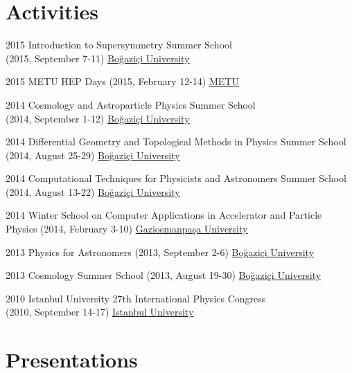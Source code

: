 \documentclass[]{friggeri-cv}
\begin{document}
\section{Activities}

\begin{entrylist}
		 	
	\entry
	{2015}
	{Introduction to Supersymmetry  Summer School \\ \normalfont (2015, September 7-11)}
	{\href{http://fezagursey.boun.edu.tr/?sayfa=29}{Boğaziçi University}}
	
	\entry
	{2015}
	{METU HEP Days  \normalfont (2015, February 12-14)}
	{\href{http://yef.ankara.edu.tr/yefgunleri2015/index.html}{METU}}
		
	\entry
	{2014}
	{Cosmology and Astroparticle Physics Summer School \\ \normalfont (2014, September 1-12)}
	{\href{http://fezagursey.boun.edu.tr/?sayfa=33}{Boğaziçi University}}
		
	\entry
	{2014}
	{Differential Geometry and Topological Methods in Physics Summer School  \normalfont (2014, August 25-29)}
	{\href{http://fezagursey.boun.edu.tr/?sayfa=32}{Boğaziçi University}}
		
	\entry
	{2014}
	{Computational Techniques for Physicists and Astronomers Summer School  \normalfont (2014, August 13-22)}
	{\href{http://fezagursey.boun.edu.tr/?sayfa=31}{Boğaziçi University}}
	
	\entry
	{2014}
	{Winter School on Computer Applications in Accelerator and Particle Physics \normalfont (2014, February 3-10)}
	{\href{http://hpfbu.web.cern.ch/hpfbu/HPFBU2014/HPFBU2014.html}{Gaziosmanpaşa University}}
		
	\entry
	{2013}
	{Physics for Astronomers \normalfont (2013, September 2-6)}
	{\href{http://fezagursey.boun.edu.tr/?sayfa=36}{Boğaziçi University}}
	
  	\entry
  	{2013}
    {Cosmology Summer School \normalfont (2013, August 19-30)}
    {\href{http://fezagursey.boun.edu.tr/?sayfa=35}{Boğaziçi University}}
    
    \entry
    {2010}
    {Istanbul University 27th International Physics  Congress \\ \normalfont (2010, September 14-17)}
    {\href{http://www.tfd.com.tr/arsiv/TFD/27/Wc9f53756aa549.htm}{Istanbul University}}

\end{entrylist}


\section{Presentations}
\end{document}

